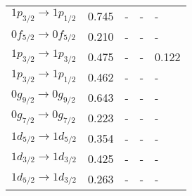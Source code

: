 \begin{table}
\begin{tabular}{lllll}
    $1p_{3/2}\to 1p_{1/2}$ & 0.745 & - & - & - \\
    $0f_{5/2}\to 0f_{5/2}$ & 0.210\tablenotemark[2] & - & - & - \\
    $1p_{3/2}\to 1p_{3/2}$ & 0.475\tablenotemark[2] & - & - & 0.122 \\
    $1p_{3/2}\to 1p_{1/2}$ & 0.462\tablenotemark[2] & - & - & - \\
    $0g_{9/2}\to 0g_{9/2}$ & 0.643 & - & - & - \\
    $0g_{7/2}\to 0g_{7/2}$ & 0.223 & - & - & - \\
    $1d_{5/2}\to 1d_{5/2}$ & 0.354 & - & - & - \\
    $1d_{3/2}\to 1d_{3/2}$ & 0.425 & - & - & - \\
    $1d_{5/2}\to 1d_{3/2}$ & 0.263 & - & - & - \\
  \end{tabular}
  \label{table:sptrans}
\end{table}

